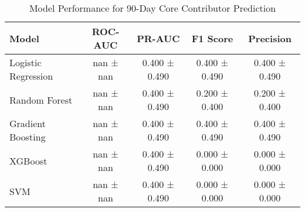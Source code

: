 \begin{table}[htbp]
\centering
\caption{Model Performance for 90-Day Core Contributor Prediction}
\label{tab:model_performance}
\begin{tabular}{lcccc}
\toprule
Model & ROC-AUC & PR-AUC & F1 Score & Precision \\
\midrule
Logistic Regression & nan ± nan & 0.400 ± 0.490 & 0.400 ± 0.490 & 0.400 ± 0.490 \\
Random Forest & nan ± nan & 0.400 ± 0.490 & 0.200 ± 0.400 & 0.200 ± 0.400 \\
Gradient Boosting & nan ± nan & 0.400 ± 0.490 & 0.400 ± 0.490 & 0.400 ± 0.490 \\
XGBoost & nan ± nan & 0.400 ± 0.490 & 0.000 ± 0.000 & 0.000 ± 0.000 \\
SVM & nan ± nan & 0.400 ± 0.490 & 0.000 ± 0.000 & 0.000 ± 0.000 \\
\bottomrule
\end{tabular}
\end{table}